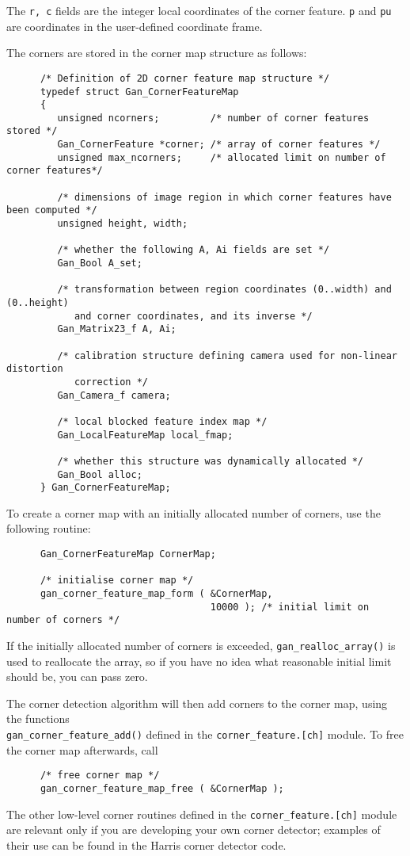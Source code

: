 The {\tt r, c} fields are the integer local coordinates of the corner feature.
{\tt p} and {\tt pu} are coordinates in the user-defined coordinate frame.

The corners are stored in the corner map structure as follows:
\begin{verbatim}
      /* Definition of 2D corner feature map structure */
      typedef struct Gan_CornerFeatureMap
      {
         unsigned ncorners;         /* number of corner features stored */
         Gan_CornerFeature *corner; /* array of corner features */
         unsigned max_ncorners;     /* allocated limit on number of corner features*/

         /* dimensions of image region in which corner features have been computed */
         unsigned height, width;

         /* whether the following A, Ai fields are set */
         Gan_Bool A_set;

         /* transformation between region coordinates (0..width) and (0..height)
            and corner coordinates, and its inverse */
         Gan_Matrix23_f A, Ai;

         /* calibration structure defining camera used for non-linear distortion
            correction */
         Gan_Camera_f camera;

         /* local blocked feature index map */
         Gan_LocalFeatureMap local_fmap;

         /* whether this structure was dynamically allocated */
         Gan_Bool alloc;
      } Gan_CornerFeatureMap;
\end{verbatim}

To create a corner map with an initially allocated number of corners,
use the following routine:
\begin{verbatim}
      Gan_CornerFeatureMap CornerMap;

      /* initialise corner map */
      gan_corner_feature_map_form ( &CornerMap,
                                    10000 ); /* initial limit on number of corners */
\end{verbatim}
If the initially allocated number of corners is exceeded,
{\tt gan\_realloc\_array()} is used to reallocate the array,
so if you have no idea what reasonable initial limit should be,
you can pass zero.

The corner detection algorithm will then add corners to the corner map,
using the functions\\ {\tt gan\_corner\_feature\_add()} defined in the
{\tt corner\_feature.[ch]} module. To free the corner map afterwards, call
\begin{verbatim}
      /* free corner map */
      gan_corner_feature_map_free ( &CornerMap );
\end{verbatim}
The other low-level corner routines defined
in the {\tt corner\_feature.[ch]} module are
relevant only if you are developing your own corner detector; examples
of their use can be found in the Harris corner detector code.

